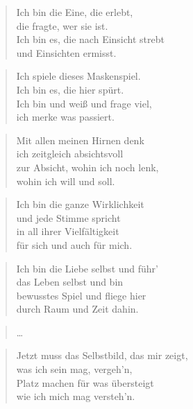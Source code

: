 \documentclass[10pt,a4paper]{article}
\begin{document}
\begin{paracol}{2}
\begin{verse}
Ich bin die Eine, die erlebt, \\
die fragte, wer sie ist. \\
Ich bin es, die nach Einsicht strebt \\
und Einsichten ermisst. \\
\end{verse}

\begin{verse}
Ich spiele dieses Maskenspiel. \\
Ich bin es, die hier spürt. \\
Ich bin und weiß und frage viel, \\
ich merke was passiert. \\
\end{verse}

\begin{verse}
Mit allen meinen Hirnen denk \\
ich zeitgleich absichtsvoll \\
zur Absicht, wohin ich noch lenk, \\
wohin ich will und soll. \\
\end{verse}

\begin{verse}
Ich bin die ganze Wirklichkeit \\
und jede Stimme spricht \\
in all ihrer Vielfältigkeit \\
für sich und auch für mich. \\
\end{verse}

\begin{verse}
Ich bin die Liebe selbst und führ’ \\
das Leben selbst und bin \\
bewusstes Spiel und fliege hier \\
durch Raum und Zeit dahin. \\
\end{verse}

\begin{verse}
…
\end{verse}

\begin{verse}
Jetzt muss das Selbstbild, das mir zeigt, \\
was ich sein mag, vergeh’n, \\
Platz machen für was übersteigt \\
wie ich mich mag versteh’n. \\
\end{verse}


\end{paracol}
\end{document}
